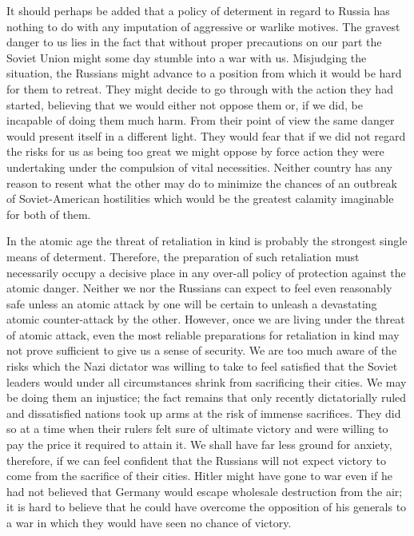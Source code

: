 It should perhaps be added that a policy of determent in regard to Russia has nothing to do with any imputation of aggressive or warlike motives. The gravest danger to us lies in the fact that without proper precautions on our part the Soviet Union might some day stumble into a war with us. Misjudging the situation, the Russians might advance to a position from which it would be hard for them to retreat. They might decide to go through with the action they had started, believing that we would either not oppose them or, if we did, be incapable of doing them much harm. From their point of view the same danger would present itself in a different light. They would fear that if we did not regard the risks for us as being too great we might oppose by force action they were undertaking under the compulsion of vital necessities. Neither country has any reason to resent what the other may do to minimize the chances of an outbreak of Soviet-American hostilities which would be the greatest calamity imaginable for both of them.

In the atomic age the threat of retaliation in kind is probably the strongest single means of determent. Therefore, the preparation of such retaliation must necessarily occupy a decisive place in any over-all policy of protection against the atomic danger. Neither we nor the Russians can expect to feel even reasonably safe unless an atomic attack by one will be certain to unleash a devastating atomic counter-attack by the other. However, once we are living under the threat of atomic attack, even the most reliable preparations for retaliation in kind may not prove sufficient to give us a sense of security. We are too much aware of the risks which the Nazi dictator was willing to take to feel satisfied that the Soviet leaders would under all circumstances shrink from sacrificing their cities. We may be doing them an injustice; the fact remains that only recently dictatorially ruled and dissatisfied nations took up arms at the risk of immense sacrifices. They did so at a time when their rulers felt sure of ultimate victory and were willing to pay the price it required to attain it. We shall have far less ground for anxiety, therefore, if we can feel confident that the Russians will not expect victory to come from the sacrifice of their cities. Hitler might have gone to war even if he had not believed that Germany would escape wholesale destruction from the air; it is hard to believe that he could have overcome the opposition of his generals to a war in which they would have seen no chance of victory.

